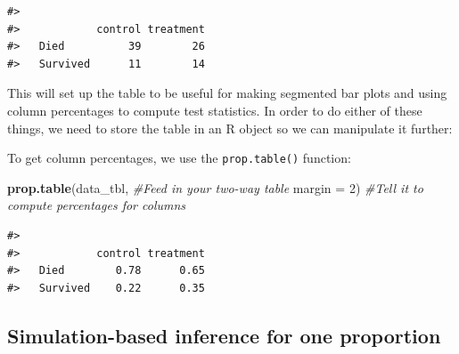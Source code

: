 \documentclass[
  10pt,
  openany]{book}
\newenvironment{Shaded}{\begin{snugshade}}{\end{snugshade}}
\newcommand{\AttributeTok}[1]{\textcolor[rgb]{0.13,0.29,0.53}{#1}}
\newcommand{\CommentTok}[1]{\textcolor[rgb]{0.56,0.35,0.01}{\textit{#1}}}
\newcommand{\DecValTok}[1]{\textcolor[rgb]{0.00,0.00,0.81}{#1}}
\newcommand{\FunctionTok}[1]{\textcolor[rgb]{0.13,0.29,0.53}{\textbf{#1}}}
\newcommand{\NormalTok}[1]{#1}
\newcommand{\OtherTok}[1]{\textcolor[rgb]{0.56,0.35,0.01}{#1}}
\newcommand{\SpecialCharTok}[1]{\textcolor[rgb]{0.81,0.36,0.00}{\textbf{#1}}}
\theoremstyle{definition}
\theoremstyle{definition}
\theoremstyle{definition}
\theoremstyle{definition}
\theoremstyle{remark}
\begin{document}
\begin{Shaded}
\end{Shaded}

\begin{verbatim}
#>           
#>            control treatment
#>   Died          39        26
#>   Survived      11        14
\end{verbatim}

This will set up the table to be useful for making segmented bar plots and using column percentages to compute test statistics. In order to do either of these things, we need to store the table in an R object so we can manipulate it further:

\begin{Shaded}
\end{Shaded}

To get column percentages, we use the \texttt{prop.table()} function:

\begin{Shaded}
\begin{Highlighting}[]
\FunctionTok{prop.table}\NormalTok{(data\_tbl,  }\CommentTok{\#Feed in your two{-}way table}
           \AttributeTok{margin =} \DecValTok{2}\NormalTok{)  }\CommentTok{\#Tell it to compute percentages for columns}
\end{Highlighting}
\end{Shaded}

\begin{verbatim}
#>           
#>            control treatment
#>   Died        0.78      0.65
#>   Survived    0.22      0.35
\end{verbatim}

\subsection*{Simulation-based inference for one proportion}\label{simulation-based-inference-for-one-proportion}
\end{document}
